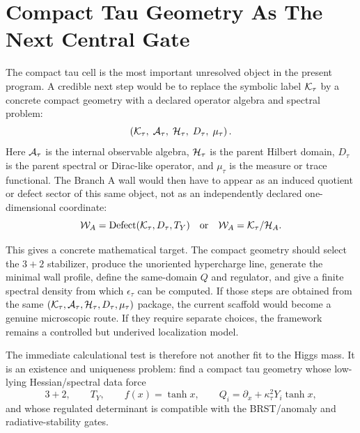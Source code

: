 \documentclass[11pt]{article}
\begin{document}
\section{Compact Tau Geometry As The Next Central Gate}
The compact tau cell is the most important unresolved object in the present
program.  A credible next step would be to replace the symbolic label
${\cal K}_\tau$ by a concrete compact geometry with a declared operator
algebra and spectral problem:
\begin{equation}
\left({\cal K}_\tau,\;{\cal A}_\tau,\;{\cal H}_\tau,\;D_\tau,\;\mu_\tau\right).
\end{equation}
Here ${\cal A}_\tau$ is the internal observable algebra, ${\cal H}_\tau$ is
the parent Hilbert domain, $D_\tau$ is the parent spectral or Dirac-like
operator, and $\mu_\tau$ is the measure or trace functional.  The Branch A wall
would then have to appear as an induced quotient or defect sector of this same
object, not as an independently declared one-dimensional coordinate:
\begin{equation}
{\cal W}_A
=
{\rm Defect}({\cal K}_\tau,D_\tau,T_Y)
\quad\hbox{or}\quad
{\cal W}_A={\cal K}_\tau/{\cal H}_A .
\end{equation}

This gives a concrete mathematical target.  The compact geometry should select
the $3+2$ stabilizer, produce the unoriented hypercharge line, generate the
minimal wall profile, define the same-domain $Q$ and regulator, and give a
finite spectral density from which $\epsilon_\tau$ can be computed.  If those
steps are obtained from the same $({\cal K}_\tau,{\cal A}_\tau,{\cal H}_\tau,D_\tau,\mu_\tau)$
package, the current scaffold would become a genuine microscopic route.  If
they require separate choices, the framework remains a controlled but
underived localization model.

The immediate calculational test is therefore not another fit to the Higgs
mass.  It is an existence and uniqueness problem: find a compact tau geometry
whose low-lying Hessian/spectral data force
\begin{equation}
3+2,\qquad T_Y,\qquad f(x)=\tanh x,\qquad
Q_i=\partial_x+\kappa_\tau^2Y_i\tanh x,
\end{equation}
and whose regulated determinant is compatible with the BRST/anomaly and
radiative-stability gates.
\end{document}
